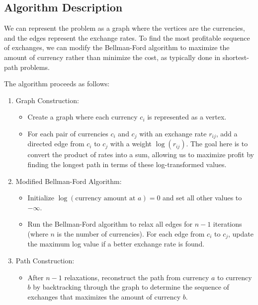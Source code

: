 \documentclass[11pt]{article}
\begin{document}
\subsection*{Algorithm Description}

We can represent the problem as a graph where the vertices are the currencies, and the edges represent the exchange rates. To find the most profitable sequence of exchanges, we can modify the Bellman-Ford algorithm to maximize the amount of currency rather than minimize the cost, as typically done in shortest-path problems.

The algorithm proceeds as follows:

\begin{enumerate}
    \item Graph Construction:
    \begin{itemize}
        \item Create a graph where each currency \( c_i \) is represented as a vertex.
        \item For each pair of currencies \( c_i \) and \( c_j \) with an exchange rate \( r_{ij} \), add a directed edge from \( c_i \) to \( c_j \) with a weight \( \log(r_{ij}) \). The goal here is to convert the product of rates into a sum, allowing us to maximize profit by finding the longest path in terms of these log-transformed values.
    \end{itemize}
    
    \item Modified Bellman-Ford Algorithm:
    \begin{itemize}
        \item Initialize \( \log(\text{currency amount at } a) = 0 \) and set all other values to \( -\infty \).
        \item Run the Bellman-Ford algorithm to relax all edges for \( n-1 \) iterations (where \( n \) is the number of currencies). For each edge from \( c_i \) to \( c_j \), update the maximum log value if a better exchange rate is found.
    \end{itemize}
    
    \item Path Construction:
    \begin{itemize}
        \item After \( n-1 \) relaxations, reconstruct the path from currency \( a \) to currency \( b \) by backtracking through the graph to determine the sequence of exchanges that maximizes the amount of currency \( b \).
    \end{itemize}
\end{enumerate}
\end{document}
